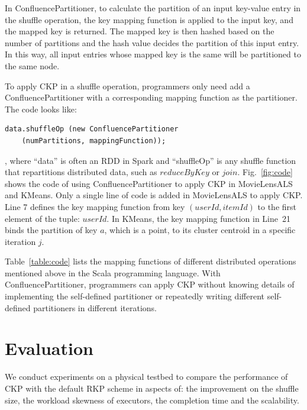 \documentclass[10pt,journal,compsoc]{IEEEtran}
\begin{document}
In ConfluencePartitioner, to calculate the partition of an input key-value entry in the shuffle operation, 
the key mapping function is applied to the input key, 
and the mapped key is returned. 
The mapped key is then hashed based on the number of partitions 
and the hash value decides the partition of this input entry. 
In this way, all input entries whose mapped key is the same will be partitioned to the same node.


To apply CKP in a shuffle operation, programmers only need 
add a ConfluencePartitioner with a corresponding 
mapping function as the partitioner. 
The code looks like:
\begin{lstlisting}
data.shuffleOp (new ConfluencePartitioner 
    (numPartitions, mappingFunction));
\end{lstlisting}
, where ``data'' is often an RDD in Spark and ``shuffleOp'' is any shuffle function that repartitions distributed data, such as $reduceByKey$ or $join$. 
Fig.~\ref{fig:code} shows the code of using ConfluencePartitioner
to apply CKP in MovieLensALS and KMeans.
Only a single line of code is added in MovieLensALS to apply CKP.
Line 7 defines the key mapping function from key $(userId, itemId)$ to the first element of the tuple: $userId$.
In KMeans, the key mapping function in Line~21 binds the partition of 
key $a$, which is a point, to its cluster centroid in a specific iteration $j$.


Table~\ref{table:code} lists the mapping functions of different distributed operations mentioned above in the Scala programming language.
With ConfluencePartitioner, programmers can apply CKP without knowing details of implementing the self-defined partitioner or repeatedly writing different self-defined partitioners in different iterations.


\section{Evaluation}\label{section:evaluation}
We conduct experiments on a physical testbed to compare the performance of CKP with the default RKP scheme in aspects of: the improvement on the shuffle size, the workload skewness of executors, the completion time and the scalability. 
\end{document}

